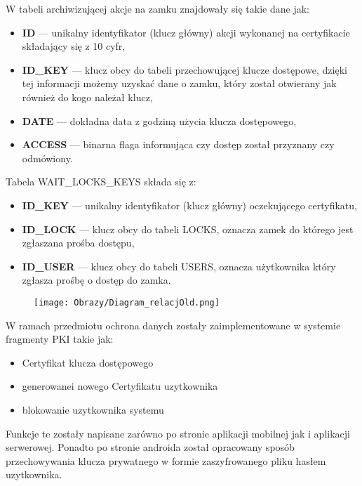 	W tabeli archiwizującej akcje na zamku znajdowały się takie dane jak:
	\begin{itemize}
		\item \textbf{ID} --- unikalny identyfikator (klucz główny) akcji wykonanej na certyfikacie składający się z 10 cyfr,
		\item \textbf{ID\_KEY} --- klucz obcy do tabeli przechowującej klucze dostępowe, dzięki tej informacji możemy uzyskać dane o zamku, który został otwierany jak również do kogo należał klucz,
		\item \textbf{DATE} --- dokładna data z godziną użycia klucza dostępowego,
		\item \textbf{ACCESS} --- binarna flaga informująca czy dostęp został przyznany czy odmówiony.
	\end{itemize}
	
	Tabela WAIT\_LOCKS\_KEYS składa się z:
	\begin{itemize}
		\item \textbf{ID\_KEY} --- unikalny identyfikator (klucz główny) oczekującego certyfikatu,
		\item \textbf{ID\_LOCK} --- klucz obcy do tabeli LOCKS, oznacza zamek do którego jest zgłaszana prośba dostępu,
		\item \textbf{ID\_USER} --- klucz obcy do tabeli USERS, oznacza użytkownika który zgłasza prośbę o dostęp do zamka.
	\end{itemize}
	
	
	
	
	
	
	
	
	
	
	
	
	
	
	
		\begin{figure}[!h]
		\centering
		\texttt{[image: Obrazy/Diagram\_relacjOld.png]}
		\label{diagram:diagram relacji}
	\end{figure}

	W ramach przedmiotu ochrona danych zostały zaimplementowane w systemie fragmenty PKI takie jak:
	   \begin{itemize}
	   	\item Certyfikat klucza dostępowego
	   	\item  generowanei nowego Certyfikatu uzytkownika
	   	\item blokowanie uzytkownika systemu
	   \end{itemize}
	 Funkcje te zostały napisane zarówno po stronie aplikacji mobilnej jak i aplikacji serwerowej. Ponadto po stronie androida został opracowany sposób przechowywania klucza prywatnego w formie zaszyfrowanego pliku hasłem uzytkownika.
